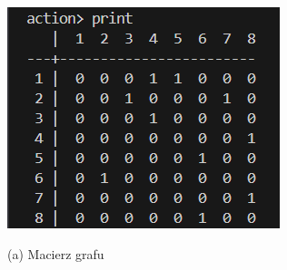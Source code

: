 \documentclass{article}
\begin{document}
	\begin{figure}[htbp]
		\centering
		\begin{minipage}[b]{0.3\textwidth}
			\centering
			\includegraphics[width=\textwidth]{reprezentacja_matrix_k.png}
			\par\small (a) Macierz grafu
			

\end{minipage}
\end{figure}
\end{document}
